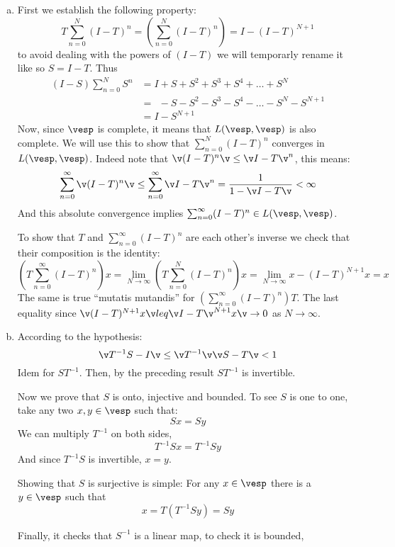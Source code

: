 \begin{enumerate}[(a)]
\item First we establish the following property:
$$T\sum_{n=0}^N (I-T)^n = \left(\sum_{n=0}^N (I-T)^n\right)= I-(I-T)^{N+1}$$
to avoid dealing with the powers of $(I-T)$ we will temporarly rename it like so $S= I-T$. Thus
\begin{align*} 
(I-S)\sum_{n=0}^N S^n &= I+S+S^2+S^3+S^4+\ldots + S^N\\
            &=\phantom{I}-S-S^2-S^3-S^4-\ldots -S^N-S^{N+1}\\
            &=I-S^{N+1}
\end{align*}
Now, since $\vesp$ is complete, it means that $L(\vesp,\vesp)$ is also complete. 
We will use this to show that $\sum_{n=0}^N (I-T)^n$ converges in $L(\vesp,\vesp)$.
Indeed note that $\v(I-T)^n\v\leq \v I-T\v^n$, this means:
$$\sum_{n=0}^\infty \v(I-T)^n\v \leq \sum_{n=0}^\infty \v I-T\v^n=\frac 1{1-\v I-T\v}<\infty$$
And this absolute convergence implies $\sum_{n=0}^\infty (I-T)^n\in L(\vesp,\vesp)$.

To show that $T$ and $\sum_{n=0}^\infty (I-T)^n$ are each other's inverse we check that their composition is the identity:
$$\left(T\sum_{n=0}^\infty (I-T)^n\right)x=\lim_{N\to \infty} \left(T\sum_{n=0}^N (I-T)^n\right)x= \lim_{N\to\infty} x-(I-T)^{N+1}x=x$$
The same is true ``mutatis mutandis'' for $\left(\sum_{n=0}^\infty (I-T)^n\right)T$.
The last equality since $ \v(I-T)^{N+1}x\v leq \v I-T\v^{N+1}x\v\to 0$ as $N\to \infty$.

\item According to the hypothesis:
$$\v T^{-1}S-I\v \leq \v T^{-1}\v \v S-T\v <1$$
Idem for $ST^{-1}$.
Then, by the preceding result $ST^{-1}$ is invertible. 

Now we prove that $S$ is onto, injective and bounded. 
To see $S$ is one to one, take any two $x,y\in\vesp$ such that:
$$Sx= Sy$$
We can multiply $T^{-1}$ on both sides,
$$T^{-1}Sx=T^{-1}Sy$$
And since $T^{-1}S$ is invertible, $x=y$.

Showing that $S$ is surjective is simple: For any $x\in \vesp$ there is a $y\in\vesp$ such that 
$$x=T(T^{-1}Sy)=Sy$$

Finally, it checks that $S^{-1}$ is a linear map, to check it is bounded, 
\end{enumerate}
